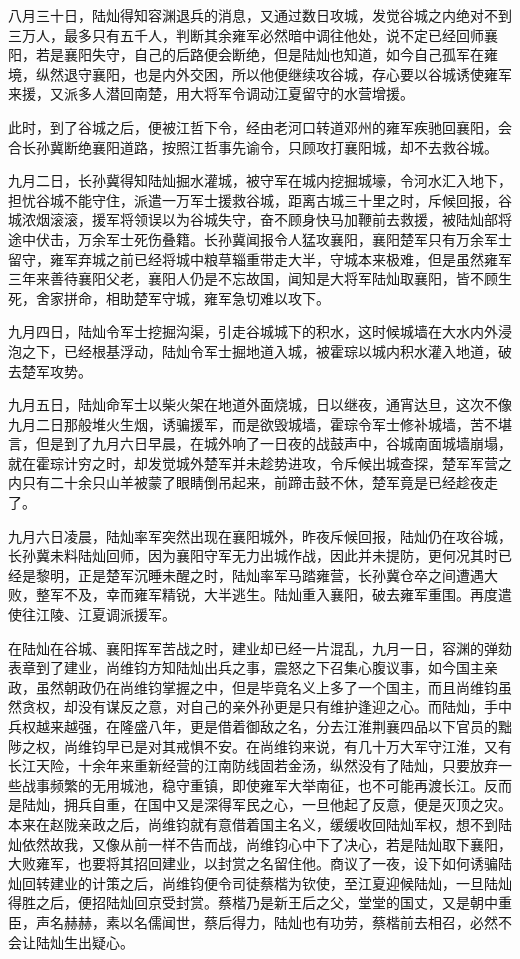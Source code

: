 八月三十日，陆灿得知容渊退兵的消息，又通过数日攻城，发觉谷城之内绝对不到三万人，最多只有五千人，判断其余雍军必然暗中调往他处，说不定已经回师襄阳，若是襄阳失守，自己的后路便会断绝，但是陆灿也知道，如今自己孤军在雍境，纵然退守襄阳，也是内外交困，所以他便继续攻谷城，存心要以谷城诱使雍军来援，又派多人潜回南楚，用大将军令调动江夏留守的水营增援。

此时，到了谷城之后，便被江哲下令，经由老河口转道邓州的雍军疾驰回襄阳，会合长孙冀断绝襄阳道路，按照江哲事先谕令，只顾攻打襄阳城，却不去救谷城。

九月二日，长孙冀得知陆灿掘水灌城，被守军在城内挖掘城壕，令河水汇入地下，担忧谷城不能守住，派遣一万军士援救谷城，距离古城三十里之时，斥候回报，谷城浓烟滚滚，援军将领误以为谷城失守，奋不顾身快马加鞭前去救援，被陆灿部将途中伏击，万余军士死伤叠籍。长孙冀闻报令人猛攻襄阳，襄阳楚军只有万余军士留守，雍军弃城之前已经将城中粮草辎重带走大半，守城本来极难，但是虽然雍军三年来善待襄阳父老，襄阳人仍是不忘故国，闻知是大将军陆灿取襄阳，皆不顾生死，舍家拼命，相助楚军守城，雍军急切难以攻下。

九月四日，陆灿令军士挖掘沟渠，引走谷城城下的积水，这时候城墙在大水内外浸泡之下，已经根基浮动，陆灿令军士掘地道入城，被霍琮以城内积水灌入地道，破去楚军攻势。

九月五日，陆灿命军士以柴火架在地道外面烧城，日以继夜，通宵达旦，这次不像九月二日那般堆火生烟，诱骗援军，而是欲毁城墙，霍琮令军士修补城墙，苦不堪言，但是到了九月六日早晨，在城外响了一日夜的战鼓声中，谷城南面城墙崩塌，就在霍琮计穷之时，却发觉城外楚军并未趁势进攻，令斥候出城查探，楚军军营之内只有二十余只山羊被蒙了眼睛倒吊起来，前蹄击鼓不休，楚军竟是已经趁夜走了。

九月六日凌晨，陆灿率军突然出现在襄阳城外，昨夜斥候回报，陆灿仍在攻谷城，长孙冀未料陆灿回师，因为襄阳守军无力出城作战，因此并未提防，更何况其时已经是黎明，正是楚军沉睡未醒之时，陆灿率军马踏雍营，长孙冀仓卒之间遭遇大败，整军不及，幸而雍军精锐，大半逃生。陆灿重入襄阳，破去雍军重围。再度遣使往江陵、江夏调派援军。

在陆灿在谷城、襄阳挥军苦战之时，建业却已经一片混乱，九月一日，容渊的弹劾表章到了建业，尚维钧方知陆灿出兵之事，震怒之下召集心腹议事，如今国主亲政，虽然朝政仍在尚维钧掌握之中，但是毕竟名义上多了一个国主，而且尚维钧虽然贪权，却没有谋反之意，对自己的亲外孙更是只有维护逢迎之心。而陆灿，手中兵权越来越强，在隆盛八年，更是借着御敌之名，分去江淮荆襄四品以下官员的黜陟之权，尚维钧早已是对其戒惧不安。在尚维钧来说，有几十万大军守江淮，又有长江天险，十余年来重新经营的江南防线固若金汤，纵然没有了陆灿，只要放弃一些战事频繁的无用城池，稳守重镇，即使雍军大举南征，也不可能再渡长江。反而是陆灿，拥兵自重，在国中又是深得军民之心，一旦他起了反意，便是灭顶之灾。本来在赵陇亲政之后，尚维钧就有意借着国主名义，缓缓收回陆灿军权，想不到陆灿依然故我，又像从前一样不告而战，尚维钧心中下了决心，若是陆灿取下襄阳，大败雍军，也要将其招回建业，以封赏之名留住他。商议了一夜，设下如何诱骗陆灿回转建业的计策之后，尚维钧便令司徒蔡楷为钦使，至江夏迎候陆灿，一旦陆灿得胜之后，便招陆灿回京受封赏。蔡楷乃是新王后之父，堂堂的国丈，又是朝中重臣，声名赫赫，素以名儒闻世，蔡后得力，陆灿也有功劳，蔡楷前去相召，必然不会让陆灿生出疑心。

